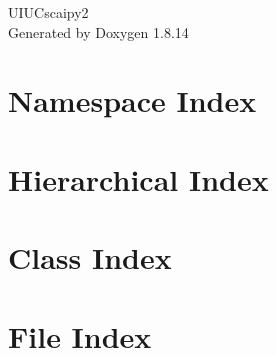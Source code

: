 \documentclass[twoside]{book}
\newcommand{\+}{\discretionary{\mbox{\scriptsize$\hookleftarrow$}}{}{}}
\newcommand{\clearemptydoublepage}{%
  \newpage{\pagestyle{empty}\cleardoublepage}%
}
\begin{document}
\hypersetup{pageanchor=false,
             bookmarksnumbered=true,
             pdfencoding=unicode
            }
\begin{titlepage}
\vspace*{7cm}
\begin{center}%
{\Large U\+I\+U\+Cscaipy2 }\\
\vspace*{1cm}
{\large Generated by Doxygen 1.8.14}\\
\end{center}
\end{titlepage}
\clearemptydoublepage
{}
\tableofcontents
\clearemptydoublepage
{}
\hypersetup{pageanchor=true}

\chapter{Namespace Index}

\chapter{Hierarchical Index}

\chapter{Class Index}

\chapter{File Index}

\end{document}
